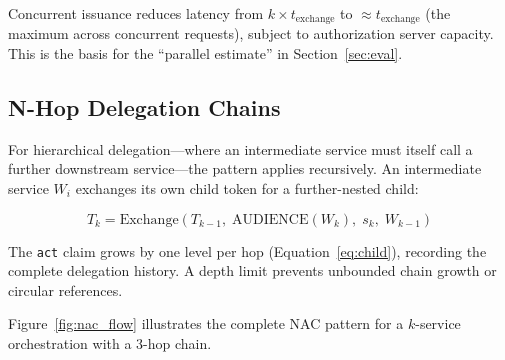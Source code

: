 \documentclass[journal]{IEEEtran}
\begin{document}
Concurrent issuance reduces latency from $k \times t_{\mathrm{exchange}}$ to
$\approx t_{\mathrm{exchange}}$ (the maximum across concurrent requests), subject
to authorization server capacity. This is the basis for the ``parallel estimate''
in Section~\ref{sec:eval}.

\subsection{N-Hop Delegation Chains}

For hierarchical delegation---where an intermediate service must itself call a
further downstream service---the pattern applies recursively. An intermediate
service $W_i$ exchanges its own child token for a further-nested child:

\begin{equation}
T_k = \mathrm{Exchange}(T_{k-1},\; \mathrm{AUDIENCE}(W_k),\; s_k,\; W_{k-1})
\label{eq:nhop}
\end{equation}

The \texttt{act} claim grows by one level per hop (Equation~\ref{eq:child}),
recording the complete delegation history. A depth limit prevents unbounded chain
growth or circular references.

Figure~\ref{fig:nac_flow} illustrates the complete NAC pattern for a
$k$-service orchestration with a 3-hop chain.
\end{document}
